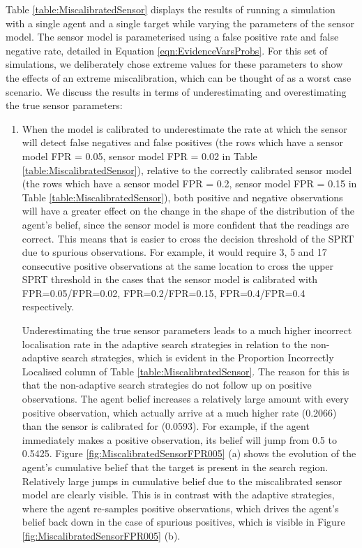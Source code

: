 Table \ref{table:MiscalibratedSensor} displays the results of running a simulation with a single agent and a single target while varying the parameters of the sensor model. The sensor model is parameterised using a false positive rate and false negative rate, detailed in Equation \ref{eqn:EvidenceVarsProbs}. For this set of simulations, we deliberately chose extreme values for these parameters to show the effects of an extreme miscalibration, which can be thought of as a worst case scenario. We discuss the results in terms of underestimating and overestimating the true sensor parameters:
\begin{enumerate}
    \item When the model is calibrated to underestimate the rate at which the sensor will detect false negatives and false positives (the rows which have a sensor model FPR = 0.05, sensor model FPR = 0.02 in Table \ref{table:MiscalibratedSensor}), relative to the correctly calibrated sensor model (the rows which have a sensor model FPR = 0.2, sensor model FPR = 0.15 in Table \ref{table:MiscalibratedSensor}), both positive and negative observations will have a greater effect on the change in the shape of the distribution of the agent's belief, since the sensor model is more confident that the readings are correct. This means that is easier to cross the decision threshold of the SPRT due to spurious observations. For example, it would require 3, 5 and 17 consecutive positive observations at the same location to cross the upper SPRT threshold in the cases that the sensor model is calibrated with FPR=0.05/FPR=0.02, FPR=0.2/FPR=0.15, FPR=0.4/FPR=0.4 respectively.
    \par Underestimating the true sensor parameters leads to a much higher incorrect localisation rate in the adaptive search strategies in relation to the non-adaptive search strategies, which is evident in the Proportion Incorrectly Localised column of Table \ref{table:MiscalibratedSensor}. The reason for this is that the non-adaptive search strategies do not follow up on positive observations. The agent belief increases a relatively large amount with every positive observation, which actually arrive at a much higher rate (0.2066) than the sensor is calibrated for (0.0593). For example, if the agent immediately makes a positive observation, its belief will jump from 0.5 to 0.5425. Figure \ref{fig:MiscalibratedSensorFPR005} (a) shows the evolution of the agent's cumulative belief that the target is present in the search region. Relatively large jumps in cumulative belief due to the miscalibrated sensor model are clearly visible. This is in contrast with the adaptive strategies, where the agent re-samples positive observations, which drives the agent's belief back down in the case of spurious positives, which is visible in Figure \ref{fig:MiscalibratedSensorFPR005} (b).
    

\end{enumerate}
